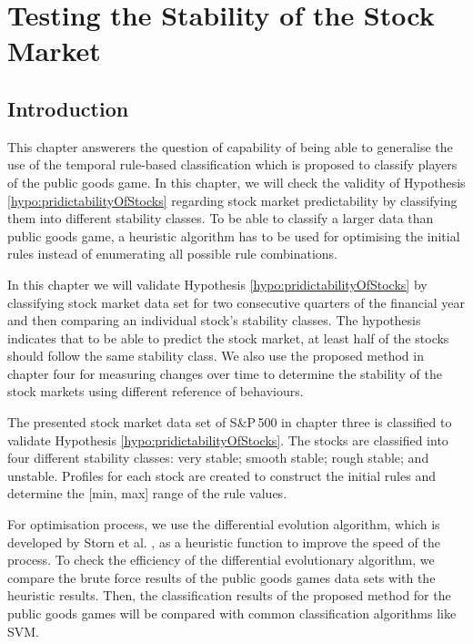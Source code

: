 \chapter{Testing the  Stability of the Stock Market}
\label{Chap:Framework}

\section{Introduction}

This chapter answerers the question of capability of being able to generalise the use of the temporal rule-based classification which is proposed to classify players of the public goods game. In this chapter, we will check the validity of Hypothesis  \ref{hypo:pridictabilityOfStocks} regarding stock market predictability by classifying them into different stability classes. To be able to classify a larger data than public goods game, a heuristic algorithm has to be used for optimising the initial rules instead of enumerating all possible rule combinations.

In this chapter we will validate Hypothesis \ref{hypo:pridictabilityOfStocks} by classifying stock market data set for two consecutive quarters of the financial year and then comparing an individual stock's stability classes. The hypothesis indicates that to be able to predict the stock market, at least half of the stocks should follow the same stability class. We also use the proposed method in chapter four for measuring changes over time to determine the stability of the stock markets using different reference of behaviours.

The presented stock market data set of  S\&P\,500 in chapter three is classified to validate Hypothesis \ref{hypo:pridictabilityOfStocks}. The stocks are classified into four different stability classes: very stable; smooth stable; rough stable; and unstable. Profiles for each stock are created to construct the initial rules and determine the [min, max] range of the rule values. 

For optimisation process, we use the differential evolution algorithm, which is developed by Storn et al.  \cite{Storn1997}, as a heuristic function to improve the speed of the process. To check the efficiency of the differential evolutionary algorithm, we compare the brute force results of the public goods games data sets with the heuristic results. Then, the classification results of the proposed method for the public goods games will be compared with common classification algorithms like SVM.

